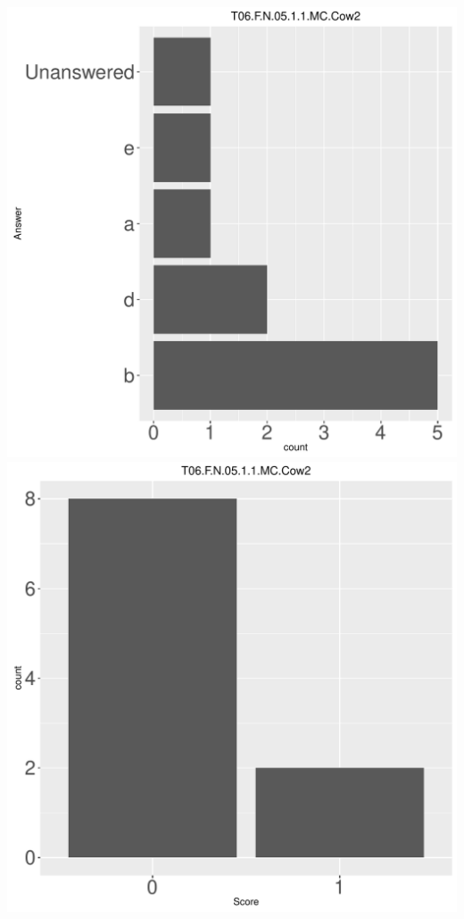 \documentclass[12pt,english,nohyper]{tufte-handout}\usepackage[]{graphicx}\usepackage[]{color}
\begin{document}
\begin{center} \includegraphics[width=.45\linewidth]{Topic06_AB_54_answer} \includegraphics[width=.45\linewidth]{Topic06_AB_54_score} \end{center} 
\end{document}
